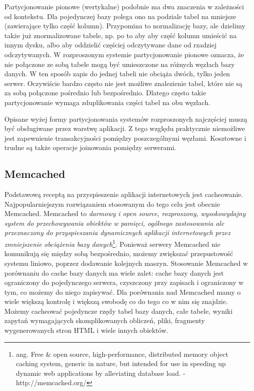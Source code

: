 
Partycjonowanie pionowe (wertykalne) podobnie ma dwa znaczenia w zależności od kontekstu.
Dla pojedynczej bazy polega ono na podziale tabel na mniejsze (zawierające tylko część kolumn).
Przypomina to normalizację bazy, ale dzielimy także już znormalizowane tabele, np. po to aby aby część kolumn umieścić na innym dysku, albo aby oddzielić częściej odczytywane dane od rzadziej odczytywanych.
W rozproszonym systemie partycjonowanie pionowe oznacza, że nie połączone ze sobą tabele mogą być umieszczone na różnych węzłach bazy danych.
W ten sposób zapis do jednej tabeli nie obciąża dwóch, tylko jeden serwer.
Oczywiście bardzo często nie jest możliwe znalezienie tabel, które nie są za sobą połączone pośrednio lub bezpośrednio.
Dlatego często takie partycjonowanie wymaga zduplikowania części tabel na obu węzłach.

Opisane wyżej formy partycjonowania systemów rozproszonych najczęściej muszą być obsługiwane przez warstwę aplikacji.
Z tego względu praktycznie niemożliwe jest zapewnienie transakcyjności pomiędzy poszczególnymi węzłami.
Kosztowne i trudne są także operacje joinowania pomiędzy serwerami.

\subsection{Memcached}

Podstawową receptą na przyspieszenie aplikacji internetowych jest cacheowanie.
Najpopularniejszym rozwiązaniem stosowanym do tego celu jest obecnie Memcached.
Memcached to \emph{darmowy i open source, rozproszony, wysokowydajny system do przechowywania obiektów w pamięci, ogólnego zastosowania ale przeznaczony do przyspieszania dynamicznych aplikacji internetowych przez zmniejszenie obciążenia bazy danych}\footnote{ang. Free \& open source, high-performance, distributed memory object caching system, generic in nature, but intended for use in speeding up dynamic web applications by alleviating database load. - http://memcached.org/}.
Ponieważ serwery Memcached nie komunikują się między sobą bezpośrednio, możemy zwiększać przepustowość systemu liniowo, poprzez dodawanie kolejnych maszyn.
Stosowanie Memcached w porównaniu do cache bazy danych ma wiele zalet: cache bazy danych jest ograniczony do pojedynczego serwera, czyszczony przy zapisach i ograniczony w tym, co możemy do niego zapisywać.
Dla porównania nad Memcached mamy o wiele większą kontrolę i większą swobodę co do tego co w nim się znajdzie.
Możemy cacheować pojedyncze rzędy tabel bazy danych, całe tabele, wyniki zapytań wymagających skomplikowanych obliczeń, pliki, fragmenty wygenerowanych stron HTML i wiele innych obiektów.

